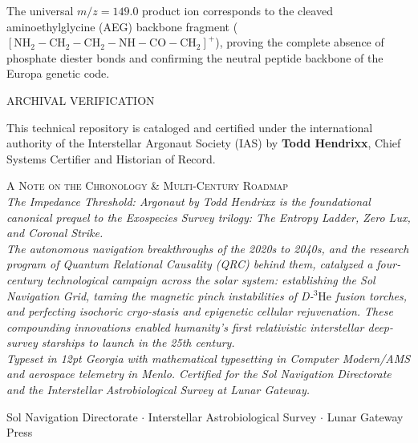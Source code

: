 \documentclass[12pt,twoside,openright]{book}
\newcommand{\sceneheader}[1]{%
  \par\vspace{1.8em}%
  {\noindent\centering\scshape\large #1\par}%
  \vspace{1.0em}%
  \noindent%
}
\newcommand{\dinkus}{%
  \par\vspace{1.2em}%
  {\noindent\centering{\large $\ast\quad\ast\quad\ast$}\par}%
  \vspace{1.2em}%
  \noindent%
}
\begin{document}
The universal \(m/z = 149.0\) product ion corresponds to the cleaved
aminoethylglycine (AEG) backbone fragment
(\([\text{NH}_2-\text{CH}_2-\text{CH}_2-\text{NH}-\text{CO}-\text{CH}_2]^+\)),
proving the complete absence of phosphate diester bonds and confirming
the neutral peptide backbone of the Europa genetic code.

\dinkus

\sceneheader{ARCHIVAL VERIFICATION}

This technical repository is cataloged and certified under the
international authority of the Interstellar Argonaut Society (IAS) by
\textbf{Todd Hendrixx}, Chief Systems Certifier and Historian of Record.

\clearpage
\thispagestyle{empty}
\vspace*{\fill}
\begin{center}
\textsc{A Note on the Chronology \& Multi-Century Roadmap}\\[0.8em]
{\footnotesize\itshape
\emph{The Impedance Threshold: Argonaut} by Todd Hendrixx is the foundational canonical prequel
to the \emph{Exospecies Survey} trilogy: \emph{The Entropy Ladder}, \emph{Zero Lux}, and \emph{Coronal Strike}.\\[0.8em]
The autonomous navigation breakthroughs of the 2020s to 2040s, and the research program of Quantum
Relational Causality (QRC) behind them, catalyzed a four-century technological campaign across the solar
system: establishing the Sol Navigation Grid, taming the magnetic pinch instabilities of D-$^3\text{He}$ fusion torches, and perfecting
isochoric cryo-stasis and epigenetic cellular rejuvenation. These compounding innovations enabled
humanity's first relativistic interstellar deep-survey starships to launch in the 25th century.\\[0.8em]
Typeset in 12pt Georgia with mathematical typesetting in \textsf{Computer Modern/AMS}
and aerospace telemetry in Menlo. Certified for the Sol Navigation Directorate
and the Interstellar Astrobiological Survey at Lunar Gateway.}
\end{center}
\vspace*{\fill}

\clearpage
\thispagestyle{empty}
\vspace*{\fill}
\begin{center}
{\scriptsize\textsf{Sol Navigation Directorate $\cdot$ Interstellar Astrobiological Survey $\cdot$ Lunar Gateway Press}}
\end{center}
\vspace*{\fill}

\clearpage
\thispagestyle{empty}
\hbox{}
\end{document}
